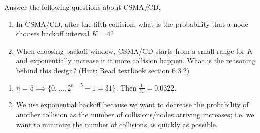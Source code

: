 \documentclass{report}
\begin{document}
\newpage
\begin{problem}

Answer the following questions about CSMA/CD.

\begin{enumerate}
    \item In CSMA/CD, after the fifth collision, what is the probability that a node chooses backoff interval $K = 4$?
    \item When choosing backoff window, CSMA/CD starts from a small range for $K$ and exponentially increase it if more collision happen. What is the reasoning behind this design? (Hint: Read textbook section 6.3.2)
\end{enumerate}

\begin{answer}{40em}
    \begin{enumerate}
        \item $n = 5 \implies \{0, \ldots, 2^{n = 5} - 1 = 31\}$. Then $\frac{1}{31} = 0.0322$.
        \item We use exponential backoff because we want to decrease the probability of another collision
            as the number of collisions/nodes arriving increases; i.e. we want to minimize the number
            of collisions as quickly as possible.
    \end{enumerate}
\end{answer}

\end{problem}
\end{document}
